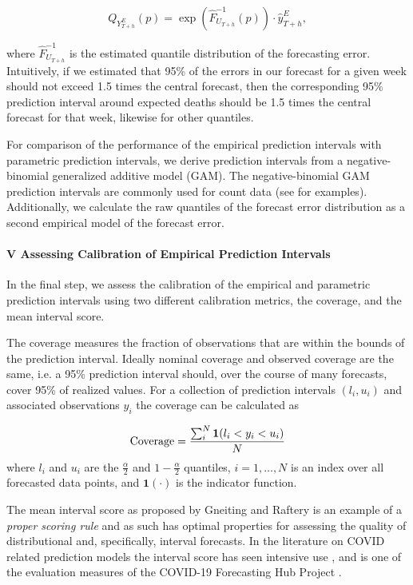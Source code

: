 \documentclass[12pt]{article}
\begin{document}
\begin{equation}
    Q_{Y^E_{T+h}}(p)=\exp(\hat{F}_{U_{T+h}}^{-1}(p))\cdot\hat{y}^E_{T+h},
\end{equation}

where $\hat{F}_{U_{T+h}}^{-1}$ is the estimated quantile distribution of the forecasting error. Intuitively, if we estimated that 95\% of the errors in our forecast for a given week should not exceed 1.5 times the central forecast, then the corresponding 95\% prediction interval around expected deaths should be 1.5 times the central forecast for that week, likewise for other quantiles.

For comparison of the performance of the empirical prediction intervals with parametric prediction intervals, we derive prediction intervals from a negative-binomial generalized additive model (GAM). The negative-binomial GAM prediction intervals are commonly used for count data (see \cite{olive2021prediction} for examples). Additionally, we calculate the raw quantiles of the forecast error distribution as a second empirical model of the forecast error.

\paragraph{V Assessing Calibration of Empirical Prediction Intervals}

In the final step, we assess the calibration of the empirical and parametric prediction intervals using two different calibration metrics, the coverage, and the mean interval score.

The coverage measures the fraction of observations that are within the bounds of the prediction interval. Ideally nominal coverage and observed coverage are the same, i.e. a 95\% prediction interval should, over the course of many forecasts, cover 95\% of realized values. For a collection of prediction intervals $(l_i, u_i)$ and associated observations $y_i$ the coverage can be calculated as

\begin{equation}
     \\
    \mathrm{Coverage} = \frac{\sum_i^N\mathbf{1}(l_i < y_i < u_i)}{N}
\end{equation}
where $l_i$ and $u_i$ are the $\frac{\alpha}{2}$ and $1-\frac{\alpha}{2}$ quantiles, $i=1,\ldots, N$ is an index over all forecasted data points, and $\mathbf{1}(\cdot)$ is the indicator function.

The mean interval score as proposed by Gneiting and Raftery \cite{Gneiting2007} is an example of a \emph{proper scoring rule} and as such has optimal properties for assessing the quality of distributional and, specifically, interval forecasts. In the literature on COVID related prediction models the interval score has seen intensive use \cite{brooks2020comparing, bracher2021evaluating, bracher2021pre, sherratt2023predictive}, and is one of the evaluation measures of the COVID-19 Forecasting Hub Project \cite{Cramer2021-hub-dataset}.
\end{document}

